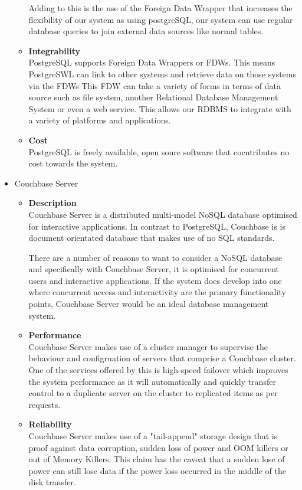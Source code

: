 \documentclass[a4paper,10pt]{article}
\begin{document}
\begin{itemize}
\begin{itemize}
				Adding to this is the use of the Foreign Data Wrapper that increases the flexibility of our system as using postgreSQL, our system can use regular database queries to join external data sources like normal tables.
				\item \textbf{Integrability}\\
				PostgreSQL supports Foreign Data Wrappers or FDWs. This means PostgreSWL can link to other systems and retrieve data on those systems via the FDWs This FDW can take a variety of forms in terms of data source such as file system, another Relational Database Management System or even a web service. This allows our RDBMS to integrate with a variety of platforms and applications. 
				\item \textbf{Cost}\\
				PostgreSQL is freely available, open soure software that cocntributes no cost towards the system.
			\end{itemize}
			
		\item Couchbase Server
			\begin{itemize}
				\item \textbf{Description}\\
				Couchbase Server is a distributed multi-model NoSQL database optimised for interactive applications. In contrast to PostgreSQL, Couchbase is is document orientated database that makes use of no SQL standards.

				There are a number of reasons to want to consider a NoSQL database and specifically with Couchbase Server, it is optimised for concurrent users and interactive applications. If the system does develop into one where concurrent access and interactivity are the primary functionality points, Couchbase Server would be an ideal database management system.
				\item \textbf{Performance}\\
				Couchbase Server makes use of a cluster manager to supervise the behaviour and configruation of servers that comprise a Couchbase cluster. One of the services offered by this is high-speed failover which improves the system performance as it will automatically and quickly transfer control to a duplicate server on the cluster to replicated items as per requests.
				\item \textbf{Reliability}\\
				Couchbase Server makes use of a "tail-append" storage design that is proof against data corruption, sudden loss of power and OOM killers or out of Memory Killers. This claim has the caveat that a sudden lose of power can still lose data if the power loss occurred in the middle of the disk transfer.


\end{itemize}
\end{itemize}
\end{document}
